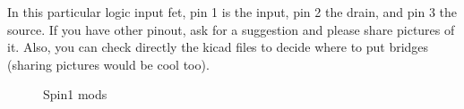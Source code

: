\documentclass[12pt,a4paper,titlepage]{article}
\begin{document}
\begin{enumerate}
In this particular logic input fet, pin 1 is the input, pin 2 the drain, and pin 3 the source. If you have other pinout, ask for a suggestion and please share pictures of it. Also, you can check directly the kicad files to decide where to put bridges (sharing pictures would be cool too).



\begin{figure}[htb]
  \centering
  \caption{Spin1 mods}
\end{figure}





\end{enumerate}
\end{document}
